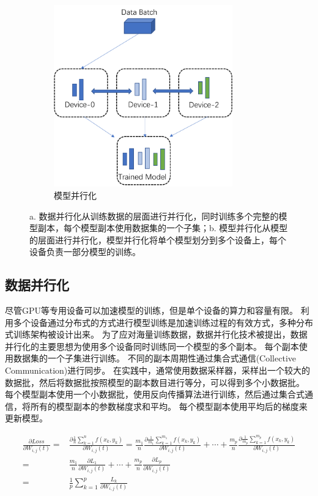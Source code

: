 \begin{figure}
\begin{subfigure}[b]{0.4\textwidth}
		\includegraphics[width=0.85\textwidth]{figure/2-background/mp.pdf}
		\caption{模型并行化}
	\end{subfigure}
	\caption*{a. 数据并行化从训练数据的层面进行并行化，同时训练多个完整的模型副本，每个模型副本使用数据集的一个子集；b. 模型并行化从模型的层面进行并行化，模型并行化将单个模型划分到多个设备上，每个设备负责一部分模型的训练。}
\end{figure}

\subsection{数据并行化}
尽管GPU等专用设备可以加速模型的训练，但是单个设备的算力和容量有限。
利用多个设备通过分布式的方式进行模型训练是加速训练过程的有效方式，多种分布式训练架构被设计出来。
为了应对海量训练数据，数据并行化技术被提出，数据并行化的主要思想为使用多个设备同时训练同一个模型的多个副本。
每个副本使用数据集的一个子集进行训练。
不同的副本周期性通过集合式通信(Collective Communication)进行同步。
在实践中，通常使用数据采样器，采样出一个较大的数据批，然后将数据批按照模型的副本数目进行等分，可以得到多个小数据批。
每个模型副本使用一个小数据批，使用反向传播算法进行训练，然后通过集合式通信，将所有的模型副本的参数梯度求和平均。
每个模型副本使用平均后的梯度来更新模型。

\begin{equation}
	\label{eq:dp}
	\begin{aligned}
		\frac{\partial Loss}{\partial W_{i,j}(t)} =& \frac{\partial \frac{1}{n} \sum_{k=1}^{n} f(x_k, y_k)}{\partial W_{i,j}(t)} = \frac{m_1}{n}\frac{\partial \frac{1}{m_1} \sum_{k=1}^{m_1} f(x_k, y_k)}{\partial W_{i,j}(t)} + \cdots + \frac{m_p}{n}\frac{\partial \frac{1}{m_p} \sum_{k=1}^{m_p} f(x_k, y_k)}{\partial W_{i,j}(t)} \\
		=& \frac{m_1}{n} \frac{\partial L_1}{\partial W_{i,j}(t)} + \cdots + \frac{m_p}{n} \frac{\partial L_p}{\partial W_{i,j}(t)} \\
		=& \frac{1}{p} \sum_{k=1}^{p} \frac{L_k}{\partial W_{i,j}(t)}
	\end{aligned}
\end{equation}


